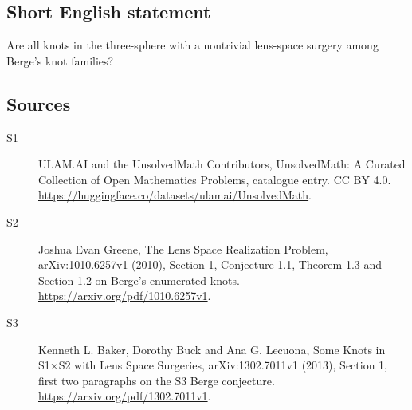 \documentclass[11pt]{article}
\begin{document}
\subsection{Short English statement}
Are all knots in the three-sphere with a nontrivial lens-space surgery among Berge’s knot families?
\subsection{Sources}
\begin{description}
\item[\hypertarget{source:statement:1}{S1}] ULAM.AI and the UnsolvedMath Contributors, UnsolvedMath: A Curated Collection of Open Mathematics Problems, catalogue entry. CC BY 4.0. \url{https://huggingface.co/datasets/ulamai/UnsolvedMath}.
\item[\hypertarget{source:statement:2}{S2}] Joshua Evan Greene, The Lens Space Realization Problem, arXiv:1010.6257v1 (2010), Section 1, Conjecture 1.1, Theorem 1.3 and Section 1.2 on Berge’s enumerated knots. \url{https://arxiv.org/pdf/1010.6257v1}.
\item[\hypertarget{source:statement:3}{S3}] Kenneth L. Baker, Dorothy Buck and Ana G. Lecuona, Some Knots in S1×S2 with Lens Space Surgeries, arXiv:1302.7011v1 (2013), Section 1, first two paragraphs on the S3 Berge conjecture. \url{https://arxiv.org/pdf/1302.7011v1}.
\end{description}
\label{end:statement}
\end{document}
